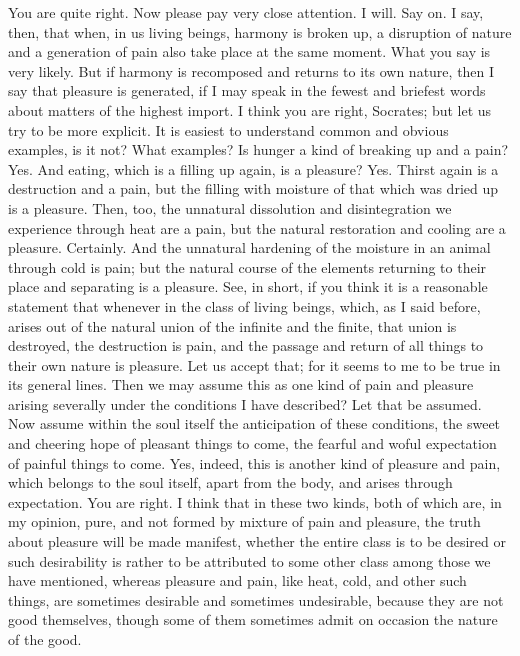 \documentclass[letterpaper,12pt]{article}
\newcommand{\stephpag}[1]{\marginnote{\small\itshape\fontfamily{ppl}\selectfont #1}}
\begin{document}
\begin{drama}
\socratesspeaks
You are quite right. Now please pay very close attention.
\protarchusspeaks
I will. Say on.
\socratesspeaks
I say, then, that when, in us living beings, harmony is broken up, a disruption of nature and a generation of pain also take place at the same moment.
\protarchusspeaks
What you say is very likely.
\socratesspeaks
But if harmony is recomposed and returns to its own nature, then I say that pleasure is generated, if I may speak in the fewest and briefest words about matters of the highest import. \stephpag{e}
\protarchusspeaks
I think you are right, Socrates; but let us try to be more explicit.
\socratesspeaks
It is easiest to understand common and obvious examples, is it not?
\protarchusspeaks
What examples?
\socratesspeaks
Is hunger a kind of breaking up and a pain?
\protarchusspeaks
Yes.
\socratesspeaks
And eating, which is a filling up again, is a pleasure?
\protarchusspeaks
Yes.
\socratesspeaks
Thirst again is a destruction and a pain, but the filling with moisture \stephpag{32 a} of that which was dried up is a pleasure. Then, too, the unnatural dissolution and disintegration we experience through heat are a pain, but the natural restoration and cooling are a pleasure.
\protarchusspeaks
Certainly.
\socratesspeaks
And the unnatural hardening of the moisture in an animal through cold is pain; but the natural course of the elements returning to their place and separating is a pleasure. See, in short, if you think it is a reasonable statement that whenever in the class of living beings, \stephpag{b} which, as I said before, arises out of the natural union of the infinite and the finite, that union is destroyed, the destruction is pain, and the passage and return of all things to their own nature is pleasure.
\protarchusspeaks
Let us accept that; for it seems to me to be true in its general lines.
\socratesspeaks
Then we may assume this as one kind of pain and pleasure arising severally under the conditions I have described?
\protarchusspeaks
Let that be assumed.
\socratesspeaks
Now assume within the soul itself the anticipation of these conditions, \stephpag{c} the sweet and cheering hope of pleasant things to come, the fearful and woful expectation of painful things to come.
\protarchusspeaks
Yes, indeed, this is another kind of pleasure and pain, which belongs to the soul itself, apart from the body, and arises through expectation.
\socratesspeaks
You are right. I think that in these two kinds, both of which are, in my opinion, pure, and not formed by mixture of pain and pleasure, the truth about pleasure will be made manifest, \stephpag{d} whether the entire class is to be desired or such desirability is rather to be attributed to some other class among those we have mentioned, whereas pleasure and pain, like heat, cold, and other such things, are sometimes desirable and sometimes undesirable, because they are not good themselves, though some of them sometimes admit on occasion the nature of the good.

\end{drama}
\end{document}
